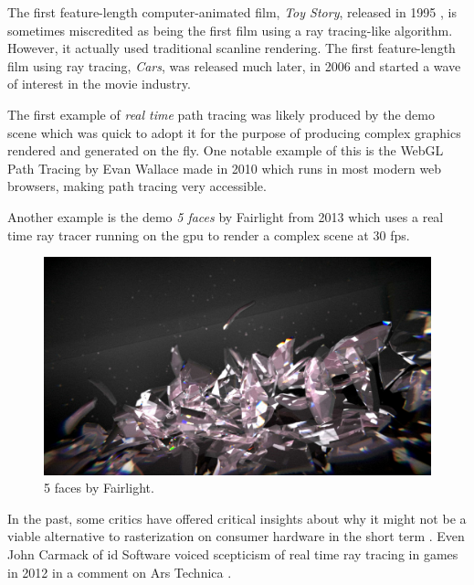\documentclass[
  twoside,
  11pt, a4paper,
  footinclude=true,
  headinclude=true,
  cleardoublepage=empty
]{scrreprt}
\begin{document}
The first feature-length computer-animated film,
\textit{Toy Story}, released in 1995 \cite{wiki:toy-story}, is sometimes miscredited as being the
first film using a ray tracing-like algorithm. However, it actually used traditional scanline
rendering. The first feature-length film using ray tracing, \textit{Cars}, was released much later,
in 2006 \cite{wiki:cars} \cite{inproceedings:cars} and started a wave of interest in the movie industry.

The first example of \emph{real time} path tracing was likely produced by the demo scene
\cite{wiki:demoscene} which was quick to adopt it \cite{site:realtime-radiosity-demos}
for the purpose of producing complex graphics rendered and generated on the fly. One notable
example of this is the WebGL Path Tracing by Evan Wallace made in 2010
\cite{site:webgl-path-tracing} which runs in most modern web browsers, making path tracing very
accessible.

Another example is the demo \textit{5 faces} by Fairlight from 2013
\cite{wiki:5faces-fairlight} which
uses a real time ray tracer running on the \acs{gpu} to render a complex scene at 30 \acs{fps}.

\begin{figure}[H]
    \includegraphics[scale=0.5]{5faces}
    \centering
    \caption{5 faces by Fairlight.}
    \label{fig:5faces}
\end{figure}

In the past, some critics have offered critical insights about why it might not be a viable
alternative to rasterization on consumer hardware in the short term
\cite{site:raytracing-vs-rasterization} \cite{site:codinghorror-raytracing}. Even John Carmack of
id Software voiced scepticism of real time ray tracing in games in 2012 in a comment on Ars Technica
\cite{site:carmack-scepticism}.
\end{document}

